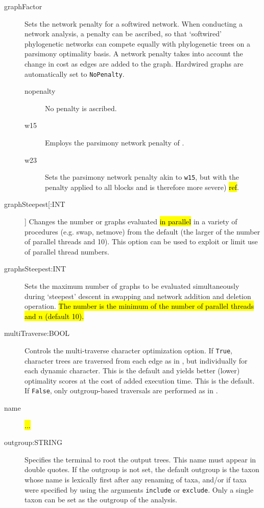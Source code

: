\begin{description}
		\item[graphFactor] Sets the network penalty for a softwired network. When conducting 
		a network analysis, a penalty can be ascribed, so that ‘softwired’ phylogenetic networks 
		can compete equally with phylogenetic trees on a parsimony optimality basis. A network 
		penalty takes into account the change in cost as edges are added to the graph. Hardwired 
		graphs are automatically set to \texttt{NoPenalty}.
			
			\begin{description}
			\item[nopenalty] No penalty is ascribed.	

			\item[w15] Employs the parsimony network penalty of \cite{Wheeler2015}.	
		
			\item[w23] Sets the parsimony network penalty akin to \texttt{w15}, but with the 
			penalty applied to all blocks and is therefore more severe) \hl{ref}.		
			\end{description}
			
		\item[graphSteepest[:INT]] Changes the number or graphs evaluated \hl{in parallel} 
		in a variety of procedures (e.g. swap, netmove) from the default (the larger of the 
		number of parallel threads and 10).  This option can be used to exploit or limit use 
		of parallel thread numbers.  
		
		\item[graphsSteepest:INT] Sets the maximum number of graphs to be evaluated 
		simultaneously during `steepest' descent in swapping and network addition and 
		deletion operation. \hl{The number is the minimum of the number of parallel threads 
		and $n$ (default 10).}

		\item[multiTraverse:BOOL] Controls the multi-traverse character optimization option. 
		If \texttt{True}, character trees are traversed from each edge as in 
		\citep{VaronandWheeler2012,VaronandWheeler2013, POY4, POY5}, but individually 
		for each dynamic character. This is the default and yields better (lower) optimality 
		scores at the cost of added execution time. This is the default.
		If \texttt{False}, only outgroup-based traversals are performed as in 
		\citep{Wheeler1996, POY2, POY3}. 
		
		\item[name] \hl{...}
			
		\item[outgroup:STRING] Specifies the terminal to root the output trees. 
		This name must appear in double quotes. If the outgroup is not set, the 
		default outgroup is the taxon whose name is lexically first after any renaming 
		of taxa, and/or if taxa were specified by using the arguments \texttt{include} 
		or \texttt{exclude}. Only a single taxon can be set as the outgroup of the analysis. 
			

\end{description}
